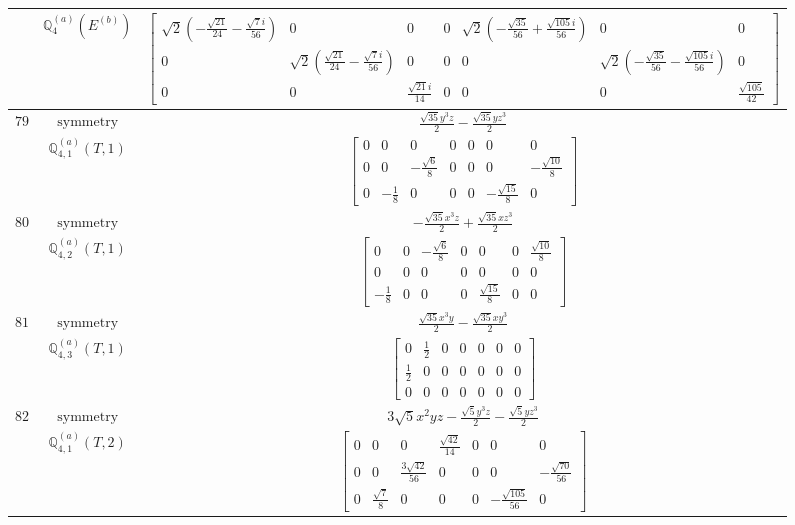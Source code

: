 \documentclass[fleqn,8pt,landscape]{jsarticle}
\begin{document}
\begin{longtable}{ccc}
$  $ & $ \mathbb{Q}_{4}^{(a)}(E^{(b)}) $ & $ \begin{bmatrix} \sqrt{2} \left(- \frac{\sqrt{21}}{24} - \frac{\sqrt{7} i}{56}\right) & 0 & 0 & 0 & \sqrt{2} \left(- \frac{\sqrt{35}}{56} + \frac{\sqrt{105} i}{56}\right) & 0 & 0 \\ 0 & \sqrt{2} \left(\frac{\sqrt{21}}{24} - \frac{\sqrt{7} i}{56}\right) & 0 & 0 & 0 & \sqrt{2} \left(- \frac{\sqrt{35}}{56} - \frac{\sqrt{105} i}{56}\right) & 0 \\ 0 & 0 & \frac{\sqrt{21} i}{14} & 0 & 0 & 0 & \frac{\sqrt{105}}{42} \end{bmatrix} $ \\ \hline
$ 79 $ & $ \text{symmetry} $ & $ \frac{\sqrt{35} y^{3} z}{2} - \frac{\sqrt{35} y z^{3}}{2} $ \\
$  $ & $ \mathbb{Q}_{4,1}^{(a)}(T,1) $ & $ \begin{bmatrix} 0 & 0 & 0 & 0 & 0 & 0 & 0 \\ 0 & 0 & - \frac{\sqrt{6}}{8} & 0 & 0 & 0 & - \frac{\sqrt{10}}{8} \\ 0 & - \frac{1}{8} & 0 & 0 & 0 & - \frac{\sqrt{15}}{8} & 0 \end{bmatrix} $ \\ \hline
$ 80 $ & $ \text{symmetry} $ & $ - \frac{\sqrt{35} x^{3} z}{2} + \frac{\sqrt{35} x z^{3}}{2} $ \\
$  $ & $ \mathbb{Q}_{4,2}^{(a)}(T,1) $ & $ \begin{bmatrix} 0 & 0 & - \frac{\sqrt{6}}{8} & 0 & 0 & 0 & \frac{\sqrt{10}}{8} \\ 0 & 0 & 0 & 0 & 0 & 0 & 0 \\ - \frac{1}{8} & 0 & 0 & 0 & \frac{\sqrt{15}}{8} & 0 & 0 \end{bmatrix} $ \\ \hline
$ 81 $ & $ \text{symmetry} $ & $ \frac{\sqrt{35} x^{3} y}{2} - \frac{\sqrt{35} x y^{3}}{2} $ \\
$  $ & $ \mathbb{Q}_{4,3}^{(a)}(T,1) $ & $ \begin{bmatrix} 0 & \frac{1}{2} & 0 & 0 & 0 & 0 & 0 \\ \frac{1}{2} & 0 & 0 & 0 & 0 & 0 & 0 \\ 0 & 0 & 0 & 0 & 0 & 0 & 0 \end{bmatrix} $ \\ \hline
$ 82 $ & $ \text{symmetry} $ & $ 3 \sqrt{5} x^{2} y z - \frac{\sqrt{5} y^{3} z}{2} - \frac{\sqrt{5} y z^{3}}{2} $ \\
$  $ & $ \mathbb{Q}_{4,1}^{(a)}(T,2) $ & $ \begin{bmatrix} 0 & 0 & 0 & \frac{\sqrt{42}}{14} & 0 & 0 & 0 \\ 0 & 0 & \frac{3 \sqrt{42}}{56} & 0 & 0 & 0 & - \frac{\sqrt{70}}{56} \\ 0 & \frac{\sqrt{7}}{8} & 0 & 0 & 0 & - \frac{\sqrt{105}}{56} & 0 \end{bmatrix} $ \\ \hline

\end{longtable}
\end{document}
